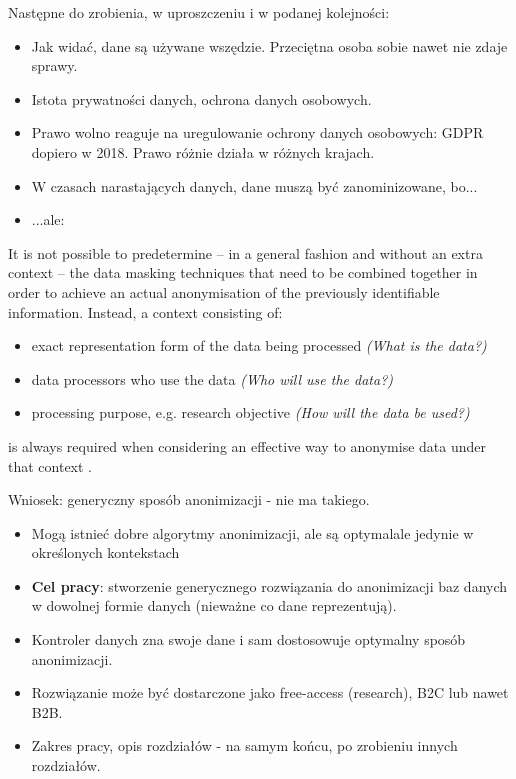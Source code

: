 \documentclass[a4paper,twoside,12pt]{book}
\begin{document}
\vfill

\footnotesize
\color{blue}
Następne do zrobienia, w uproszczeniu i w podanej kolejności:
\begin{itemize}
\item Jak widać, dane są używane wszędzie. Przeciętna osoba sobie nawet nie zdaje sprawy.
\item Istota prywatności danych, ochrona danych osobowych.
\item Prawo wolno reaguje na uregulowanie ochrony danych osobowych: GDPR dopiero w 2018. Prawo różnie działa w różnych krajach.
\item W czasach narastających danych, dane muszą być zanominizowane, bo...
\item ...ale:
\end{itemize}

\normalsize
\color{black}

It is not possible to predetermine – in a general fashion and without an extra context – the data masking techniques that need to be combined together in order to achieve an actual anonymisation of the previously identifiable information. Instead, a context consisting of:
\begin{itemize}
	\item exact representation form of the data being processed \textit{(What is the data?)}
	\item data processors who use the data \textit{(Who will use the data?)}
	\item processing purpose, e.g. research objective \textit{(How will the data be used?)}
\end{itemize}
is always required when considering an effective way to anonymise data under that context \cite{bib:anonymizing_health_data}.

\footnotesize
\color{blue}
Wniosek: generyczny sposób anonimizacji - nie ma takiego.

\begin{itemize}
\item Mogą istnieć dobre algorytmy anonimizacji, ale są optymalale jedynie w określonych kontekstach

\item \textbf{Cel pracy}: stworzenie generycznego rozwiązania do anonimizacji baz danych w dowolnej formie danych (nieważne co dane reprezentują).

\item Kontroler danych zna swoje dane i sam dostosowuje optymalny sposób anonimizacji.

\item Rozwiązanie może być dostarczone jako free-access (research), B2C lub nawet B2B.

\item Zakres pracy, opis rozdziałów - na samym końcu, po zrobieniu innych rozdziałów.
\normalsize

\end{itemize}
\color{black}
\normalsize
\end{document}
